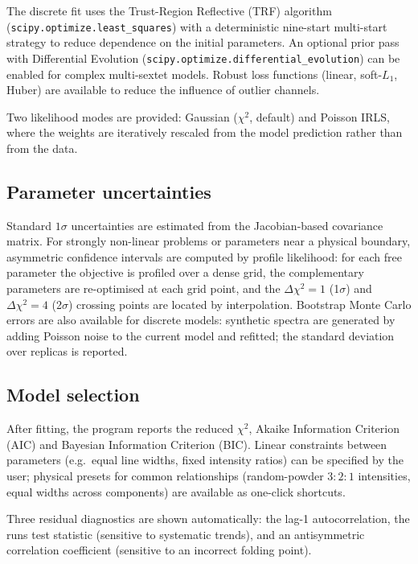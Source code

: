 \documentclass[smallcondensed]{svjour3}
\begin{document}
The discrete fit uses the Trust-Region Reflective (TRF) algorithm
(\texttt{scipy.optimize.least\_squares}) with a deterministic
nine-start multi-start strategy to reduce dependence on the initial
parameters. An optional prior pass with Differential Evolution
(\texttt{scipy.optimize.differential\_evolution}) can be enabled for
complex multi-sextet models. Robust loss functions (linear,
soft-$L_1$, Huber) are available to reduce the influence of outlier
channels.

Two likelihood modes are provided: Gaussian ($\chi^2$, default) and
Poisson IRLS, where the weights are iteratively rescaled from the model
prediction rather than from the data.

\subsection{Parameter uncertainties}
\label{sec:errors}

Standard $1\sigma$ uncertainties are estimated from the Jacobian-based
covariance matrix. For strongly non-linear problems or parameters near a
physical boundary, asymmetric confidence intervals are computed by profile
likelihood: for each free parameter the objective is profiled over a dense
grid, the complementary parameters are re-optimised at each grid point, and
the $\Delta\chi^2 = 1$ (1$\sigma$) and $\Delta\chi^2 = 4$ (2$\sigma$)
crossing points are located by interpolation. Bootstrap Monte Carlo errors
are also available for discrete models: synthetic spectra are generated by
adding Poisson noise to the current model and refitted; the standard
deviation over replicas is reported.

\subsection{Model selection}
\label{sec:modelsel}

After fitting, the program reports the reduced $\chi^2$, Akaike
Information Criterion (AIC) and Bayesian Information Criterion (BIC).
Linear constraints between parameters (e.g.\ equal line widths, fixed
intensity ratios) can be specified by the user; physical presets for
common relationships (random-powder $3:2:1$ intensities, equal widths
across components) are available as one-click shortcuts.

Three residual diagnostics are shown automatically: the lag-1
autocorrelation, the runs test statistic (sensitive to systematic trends),
and an antisymmetric correlation coefficient (sensitive to an incorrect
folding point).
\end{document}
